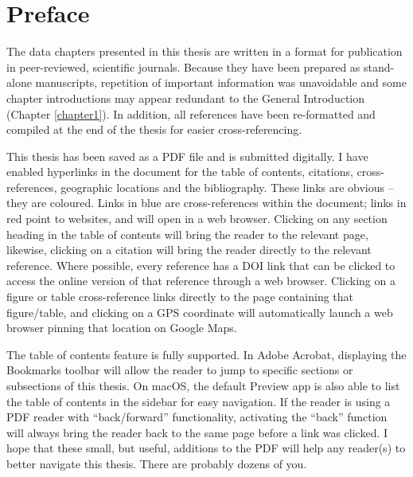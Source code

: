 
\cleardoublepage

\SingleSpacing

\chapter{Preface}

\OnehalfSpacing

The data chapters presented in this thesis are written in a format for publication in peer-reviewed, scientific journals. 
Because they have been prepared as stand-alone manuscripts, repetition of important information was unavoidable and some chapter introductions may appear redundant to the General Introduction (Chapter \ref{chapter1}).
In addition, all references have been re-formatted and compiled at the end of the thesis for easier cross-referencing.

This thesis has been saved as a PDF file and is submitted digitally. I have enabled hyperlinks in the document for the table of contents, citations, cross-references, geographic locations and the bibliography. 
These links are obvious -- they are coloured. Links in blue are cross-references within the document; links in red point to websites, and will open in a web browser.
Clicking on any section heading in the table of contents will bring the reader to the relevant page, likewise, clicking on a citation will bring the reader directly to the relevant reference.
Where possible, every reference has a DOI link that can be clicked to access the online version of that reference through a web browser.
Clicking on a figure or table cross-reference links directly to the page containing that figure/table, and clicking on a GPS coordinate will automatically launch a web browser pinning that location on Google Maps.

The table of contents feature is fully supported. In Adobe Acrobat, displaying the Bookmarks toolbar will allow the reader to jump to specific sections or subsections of this thesis. On macOS, the default Preview app is also able to list the table of contents in the sidebar for easy navigation. If the reader is using a PDF reader with ``back/forward'' functionality, activating the ``back'' function will always bring the reader back to the same page before a link was clicked.
I hope that these small, but useful, additions to the PDF will help any reader(s) to better navigate this thesis.
There are probably dozens of you.

\mainmatter

\setlength{\parindent}{0em} %

\hypersetup{linkcolor=black} %
